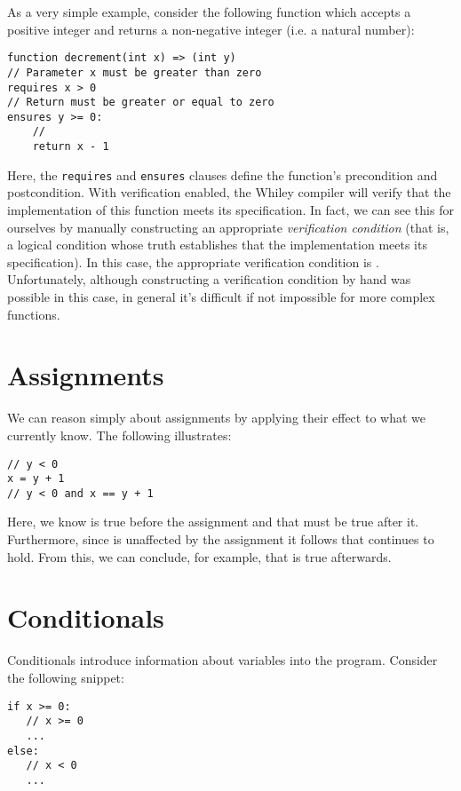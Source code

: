 As a very simple example, consider the following function which accepts a positive integer and returns a
non-negative integer (i.e. a natural number):
\begin{lstlisting}
function decrement(int x) => (int y) 
// Parameter x must be greater than zero
requires x > 0
// Return must be greater or equal to zero
ensures y >= 0:
    //
    return x - 1
\end{lstlisting}
Here, the \lstinline{requires} and \lstinline{ensures} clauses define the function's precondition and postcondition.  With verification enabled, the Whiley compiler will verify that the implementation of this function meets its specification.  In fact, we can see this for ourselves by manually constructing an appropriate {\em verification condition} (that is, a logical condition whose truth establishes that the implementation meets its specification).  In this case, the appropriate verification condition is .  Unfortunately, although constructing a verification condition by hand was possible in this case, in general it's difficult if not impossible for more complex functions.

\section{Assignments}

We can reason simply about assignments by applying their effect to what we currently know.  The following illustrates:

\begin{lstlisting}
// y < 0 
x = y + 1
// y < 0 and x == y + 1
\end{lstlisting}

Here, we know  is true before the assignment and that  must be true after it.  Furthermore, since  is unaffected by the assignment it follows that  continues to hold.  From this, we can conclude, for example, that  is true afterwards.  

\section{Conditionals}

Conditionals introduce information about variables into the program.  Consider the following snippet:

\begin{lstlisting}
if x >= 0:
   // x >= 0
   ...
else:
   // x < 0
   ...
\end{lstlisting}

